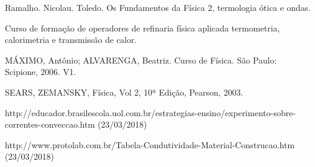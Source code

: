 \documentclass[a4wide]{report}
\begin{document}
\begin{thebibliography}{99}

 Ramalho. Nicolau. Toledo. Os Fundamentos da Física 2, termologia ótica e ondas.

 Curso de formação de operadores de refinaria física aplicada termometria, calorimetria e transmissão de calor. 

 MÁXIMO, Antônio; ALVARENGA, Beatriz. Curso de Física. São Paulo: Scipione, 2006. V1.

 SEARS, ZEMANSKY, Física, Vol 2, 10ª Edição, Pearson, 2003.

 http://educador.brasilescola.uol.com.br/estrategias-ensino/experimento-sobre-correntes-conveccao.htm (23/03/2018)

 http://www.protolab.com.br/Tabela-Condutividade-Material-Construcao.htm (23/03/2018)

\end{thebibliography}
\end{document}
